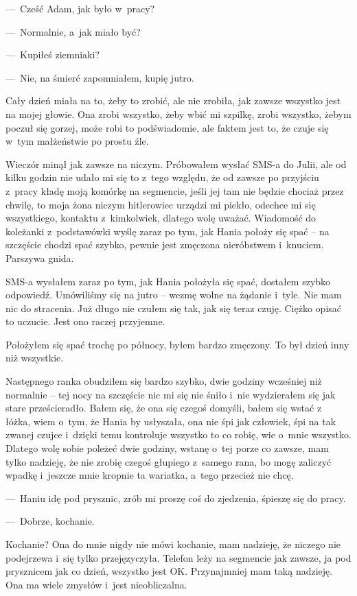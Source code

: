 ---~Cześć Adam, jak było w~pracy?

---~Normalnie, a~jak miało być?

---~Kupiłeś ziemniaki?

---~Nie, na śmierć zapomniałem, kupię jutro.

Cały dzień miała na to, żeby to zrobić, ale nie zrobiła, jak zawsze wszystko jest na mojej głowie. Ona zrobi 
wszystko, żeby wbić mi szpilkę, zrobi wszystko, żebym poczuł się gorzej, może robi to podświadomie, ale faktem jest 
to, że czuje się w~tym małżeństwie po prostu źle.

Wieczór minął jak zawsze na niczym. Próbowałem wysłać SMS-a do Julii, ale od kilku godzin nie udało mi się to z~tego 
względu, że od zawsze po przyjściu z~pracy kładę moją komórkę na segmencie, jeśli jej tam nie będzie chociaż przez 
chwilę, to moja żona niczym hitlerowiec urządzi mi piekło, odechce mi się wszystkiego, kontaktu z~kimkolwiek, dlatego 
wolę uważać. Wiadomość do koleżanki z~podstawówki wyślę zaraz po tym, jak Hania położy się spać – na szczęście chodzi 
spać szybko, pewnie jest zmęczona nieróbstwem i~knuciem. Parszywa gnida.

SMS-a wysłałem zaraz po tym, jak Hania położyła się spać, dostałem szybko odpowiedź. Umówiliśmy się na jutro -- wezmę 
wolne na żądanie i~tyle. Nie mam nic do stracenia. Już długo nie czułem się tak, jak się teraz czuję. Ciężko opisać 
to uczucie. Jest ono raczej przyjemne.

Położyłem się spać trochę po północy, byłem bardzo zmęczony. To był dzień inny niż wszystkie.

\paraSep

Następnego ranka obudziłem się bardzo szybko, dwie godziny wcześniej niż normalnie -- tej nocy na szczęście nic mi 
się nie śniło i~nie wydzierałem się jak stare prześcieradło. Bałem się, że ona się czegoś domyśli, bałem się wstać z~
łóżka, wiem o~tym, że Hania by usłyszała, ona nie śpi jak człowiek, śpi na tak zwanej czujce i~dzięki temu kontroluje 
wszystko to co robię, wie o~mnie wszystko. Dlatego wolę sobie poleżeć dwie godziny, wstanę o~tej porze co zawsze, mam 
tylko nadzieję, że nie zrobię czegoś głupiego z~samego rana, bo mogę zaliczyć wpadkę i~jeszcze mnie kropnie ta 
wariatka, a~tego przecież nie chcę.

---~Haniu idę pod prysznic, zrób mi proszę coś do zjedzenia, śpieszę się do pracy.

---~Dobrze, kochanie.

Kochanie? Ona do mnie nigdy nie mówi kochanie, mam nadzieję, że niczego nie podejrzewa i~się tylko przejęzyczyła. 
Telefon leży na segmencie jak zawsze, ja pod prysznicem jak co dzień, wszystko jest OK. Przynajmniej mam taką 
nadzieję. Ona ma wiele zmysłów i~jest nieobliczalna.

